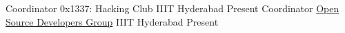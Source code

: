 
\begin{cventries}
  \cventry
    {Coordinator} %
    {0x1337: Hacking Club} %
    {IIIT Hyderabad} %
    {Present} %
    {
    }
  \cventry
    {Coordinator} %
    {\href{https://osdg.iiit.ac.in/}{Open Source Developers Group}} %
    {IIIT Hyderabad} %
    {Present} %
    {
    }
\end{cventries}
